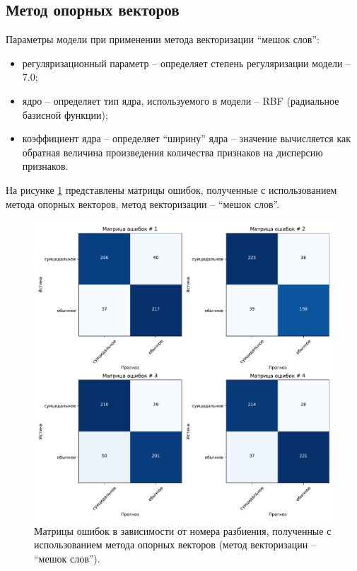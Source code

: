 \subsection{Метод опорных векторов }

Параметры модели при применении метода векторизации ``мешок слов'':
\begin{itemize}
	\item регуляризационный параметр -- определяет степень регуляризации модели -- 7.0;
	\item ядро -- определяет тип ядра, используемого в модели -- RBF (радиальное базисной функции);
	\item коэффициент ядра -- определяет ``ширину'' ядра -- значение вычисляется как обратная величина произведения количества признаков на дисперсию признаков.
\end{itemize}

На рисунке \ref{img:svcMatrBag} представлены матрицы ошибок, полученные с использованием метода опорных векторов, метод векторизации -- ``мешок слов''.
\begin{figure}[H]
	\centering
	\includegraphics[width=\textwidth]{inc/plots/svcMatrBag.pdf}
	\caption{ Матрицы ошибок в зависимости от номера разбиения, полученные с использованием метода опорных векторов (метод векторизации -- ``мешок слов''). }
	\label{img:svcMatrBag}
\end{figure}

